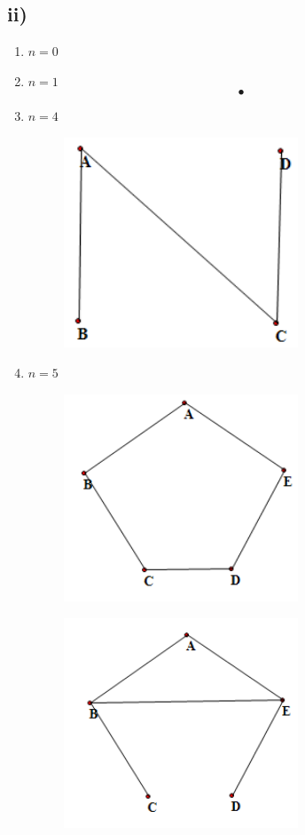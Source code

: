 \documentclass[a4paper,12pt,titlepage]{article}
\begin{document}
\subsection*{ii)}
\begin{enumerate}
\item $n=0$
\item $n=1$
$$\bullet$$
\item $n=4$
\begin{figure}[H]
    \centering
    \includegraphics[width=7cm]{84.png}
\end{figure}
\item $n=5$
\begin{figure}[H]
    \centering
    \includegraphics[width=7cm]{851.png}
\end{figure}
\begin{figure}[H]
    \centering
    \includegraphics[width=7cm]{852.png}

\end{figure}
\end{enumerate}
\end{document}
